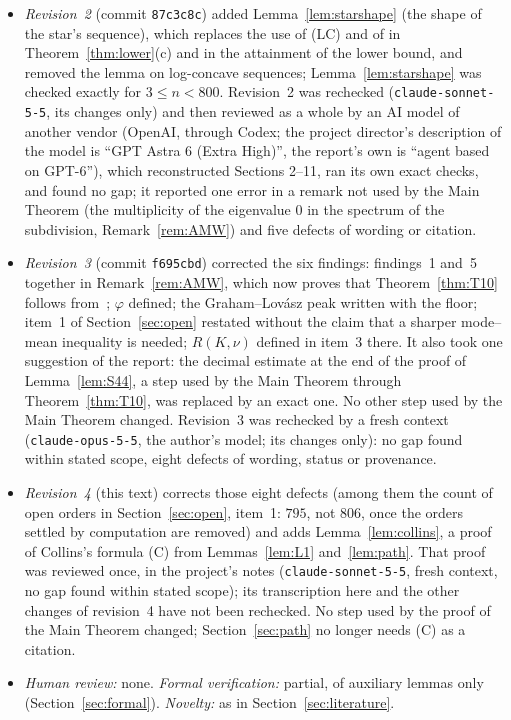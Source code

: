 \documentclass[11pt]{amsart}
\theoremstyle{definition}
\theoremstyle{remark}
\begin{document}
\begin{itemize}
proofs not used by the Main Theorem and several defects of wording and
bookkeeping, corrected in revision~2).
\item \emph{Revision~2} (commit \texttt{87c3c8c}) added
Lemma~\ref{lem:starshape} (the shape of the star's sequence), which replaces
the use of (LC) and of \cite[Theorem~1]{Col89} in
Theorem~\ref{thm:lower}(c) and in the attainment of the lower bound, and
removed the lemma on log-concave sequences; Lemma~\ref{lem:starshape} was
checked exactly for $3\le n<800$. Revision~2 was rechecked
(\nolinkurl{claude-sonnet-5-5}, its changes only) and then reviewed as a
whole by an AI model of another vendor (OpenAI, through Codex; the project
director's description of the model is ``GPT Astra 6 (Extra High)'', the
report's own is ``agent based on GPT-6''), which reconstructed Sections
2--11, ran its own exact checks, and found no gap; it reported one error in a
remark not used by the Main Theorem (the multiplicity of the eigenvalue $0$
in the spectrum of the subdivision, Remark~\ref{rem:AMW}) and five defects
of wording or citation.
\item \emph{Revision~3} (commit \texttt{f695cbd}) corrected the six
findings: findings~1 and~5 together in Remark~\ref{rem:AMW}, which now proves
that Theorem~\ref{thm:T10} follows from~\cite{AMW}; $\varphi$ defined; the
Graham--Lov\'asz peak written with the floor; item~1 of
Section~\ref{sec:open} restated without the claim that a sharper mode--mean
inequality is needed; $R(K,\nu)$ defined in item~3 there. It also took one
suggestion of the report: the decimal estimate at the end of the proof of
Lemma~\ref{lem:S44}, a step used by the Main Theorem through
Theorem~\ref{thm:T10}, was replaced by an exact one. No other step used by
the Main Theorem changed. Revision~3 was rechecked by a fresh context
(\nolinkurl{claude-opus-5-5}, the author's model; its changes only): no gap
found within stated scope, eight defects of wording, status or provenance.
\item \emph{Revision~4} (this text) corrects those eight defects (among them
the count of open orders in Section~\ref{sec:open}, item~1: $795$, not
$806$, once the orders settled by computation are removed) and adds
Lemma~\ref{lem:collins}, a proof of Collins's formula (C) from
Lemmas~\ref{lem:L1} and~\ref{lem:path}. That proof was reviewed once, in the
project's notes (\nolinkurl{claude-sonnet-5-5}, fresh context, no gap found
within stated scope); its transcription here and the other changes of
revision~4 have not been rechecked. No step used by the proof of the Main
Theorem changed; Section~\ref{sec:path} no longer needs (C) as a citation.
\item \emph{Human review:} none. \emph{Formal verification:} partial, of
auxiliary lemmas only (Section~\ref{sec:formal}). \emph{Novelty:} as in
Section~\ref{sec:literature}.
\end{itemize}
\end{document}
